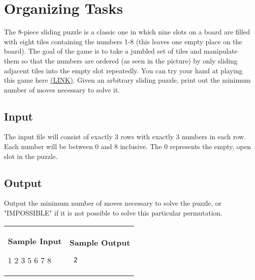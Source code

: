\documentclass[11pt]{article}
\begin{document}
\section*{Organizing Tasks}


\begin{wrapfigure}{r}{3in}
\vspace{-10pt}
\vspace{-30pt}
\end{wrapfigure}

The 8-piece sliding puzzle is a classic one in which nine slots on a board are filled with eight tiles containing the numbers 1-8 (this leaves one empty place on the board). The goal of the game is to take a jumbled set of tiles and manipulate them so that the numbers are ordered (as seen in the picture) by only sliding adjacent tiles into the empty slot repeatedly. You can try your hand at playing this game here \href{http://www.tilepuzzles.com/default.asp?p=12}{(LINK)}. Given an arbitrary sliding puzzle, print out the minimum number of moves necessary to solve it.

\subsection*{Input}
The input file will consist of exactly 3 rows with exactly 3 numbers in each row. Each number will be between 0 and 8 inclusive. The 0 represents the empty, open slot in the puzzle.

\subsection*{Output}

Output the minimum number of moves necessary to solve the puzzle, or "IMPOSSIBLE" if it is not possible to solve this particular permutation.

\vspace{0.25in}\hspace{-0.3in}\begin{tabular}{ll}

\parbox{3in}{{\large\bf Sample Input}

\vspace{0.15in}

{\tt 

1 2 3 5 6 7 8
}
}

&

\parbox{3in}{{\large\bf Sample Output}

\vspace{0.15in}

{\tt
2
}
}

\\
\end{tabular}
\end{document}
